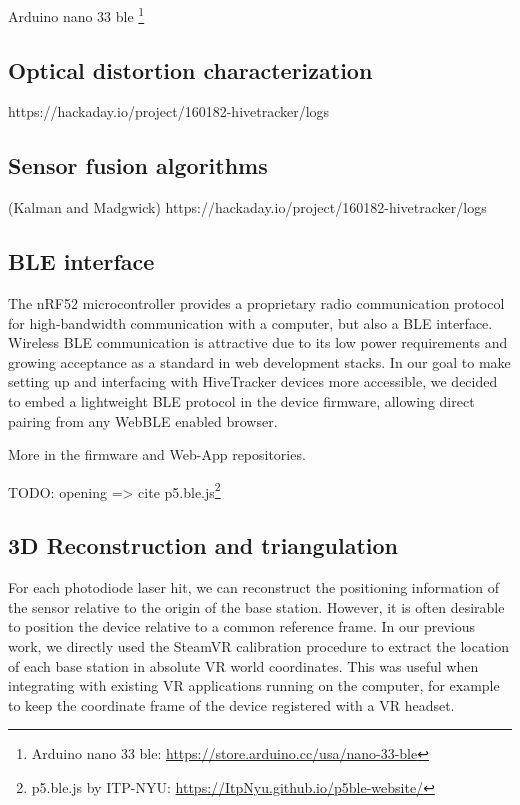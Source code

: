 \documentclass[sigchi]{acmart}
\begin{document}
Arduino nano 33 ble \footnote{Arduino nano 33 ble: \url{https://store.arduino.cc/usa/nano-33-ble}} 

\subsection{Optical distortion characterization}
https://hackaday.io/project/160182-hivetracker/logs

\subsection{Sensor fusion algorithms}
 (Kalman and Madgwick)
https://hackaday.io/project/160182-hivetracker/logs


\subsection{BLE interface}

The nRF52 microcontroller provides a proprietary radio communication protocol for high-bandwidth communication with a computer, but also a BLE interface. Wireless BLE communication is attractive due to its low power requirements and growing acceptance as a standard in web development stacks. In our goal to make setting up and interfacing with HiveTracker devices more accessible, we decided to embed a lightweight BLE protocol in the device firmware, allowing direct pairing from any WebBLE enabled browser.

More in the firmware \cite{firmwareRepo} and Web-App \cite{WebappRepo} repositories.

TODO: opening => cite p5.ble.js\footnote{p5.ble.js by ITP-NYU: \url{https://ItpNyu.github.io/p5ble-website/}}

\subsection{3D Reconstruction and triangulation}

For each photodiode laser hit, we can reconstruct the positioning information of the sensor relative to the origin of the base station. However, it is often desirable to position the device relative to a common reference frame. In our previous work, we directly used the SteamVR calibration procedure to extract the location of each base station in absolute VR world coordinates. This was useful when integrating with existing VR applications running on the computer, for example to keep the coordinate frame of the device registered with a VR headset.
\end{document}
